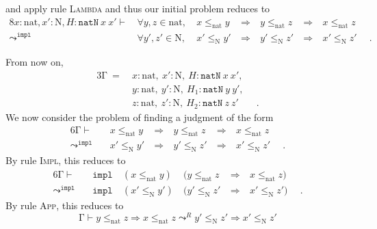 \documentclass{llncs}
\begin{document}
\begin{example}
    and apply rule \textsc{Lambda} and thus our initial problem reduces
    to
    \begin{alignat*}{8}
    x : \mathrm{nat}, x' : \mathrm{N}, H : \mathtt{natN}~x~x' \vdash\,&
        \forall y, z \in \mathrm{nat},~&
        x \leq_{\mathrm{nat}} y~& \Rightarrow~&
        y \leq_{\mathrm{nat}} z~& \Rightarrow~&
        x \leq_{\mathrm{nat}} z & \\
    \leadsto^{\mathtt{impl}}\,&
        \forall y', z' \in \mathrm{N},~&
        x' \leq_{\mathrm{N}} y'~& \Rightarrow~&
        y' \leq_{\mathrm{N}} z'~& \Rightarrow~& x'
        \leq_{\mathrm{N}} z' &
        \enspace .
    \end{alignat*}

    From now on,
    \begin{alignat*}{3}
    \mathrm{\Gamma} ~=~ &
    x : \mathrm{nat},~ x' : \mathrm{N},~ H : \mathtt{natN}~x~x', & \\ &
    y : \mathrm{nat},~ y' : \mathrm{N},~ H_1 : \mathtt{natN}~y~y', & \\ &
    z : \mathrm{nat},~ z' : \mathrm{N},~ H_2 : \mathtt{natN}~z~z' & \enspace .
    \end{alignat*}
    We now consider the problem of finding a judgment of the form
    \begin{alignat*}{6}
    \mathrm{\Gamma} \vdash \quad &
        x \leq_{\mathrm{nat}} y~& \Rightarrow~&
        y \leq_{\mathrm{nat}} z~& \Rightarrow~& x \leq_{\mathrm{nat}} z & \\
    \leadsto^{\mathtt{impl}} \quad &
        x' \leq_{\mathrm{N}} y'~& \Rightarrow~&
        y' \leq_{\mathrm{N}} z'~& \Rightarrow~& x' \leq_{\mathrm{N}} z' &
        \enspace .
    \end{alignat*}
    By rule \textsc{Impl}, this reduces to
    \begin{alignat*}{6}
    \mathrm{\Gamma} \vdash \quad &
        \mathtt{impl} ~&
        (x \leq_{\mathrm{nat}} y)~&
        (y \leq_{\mathrm{nat}} z~& \Rightarrow~& x \leq_{\mathrm{nat}} z) &
        \\
    \leadsto^{\mathtt{impl}} \quad &
        \mathtt{impl} ~&
        (x' \leq_{\mathrm{N}} y')~&
        (y' \leq_{\mathrm{N}} z'~& \Rightarrow~& x' \leq_{\mathrm{N}} z') &
        \enspace .
    \end{alignat*}
    By rule \textsc{App}, this reduces to
    \begin{equation}
    \mathrm{\Gamma} \vdash
    y \leq_{\mathrm{nat}} z \Rightarrow x \leq_{\mathrm{nat}} z
    \leadsto^{R}
    y' \leq_{\mathrm{N}} z' \Rightarrow x' \leq_{\mathrm{N}} z'

\end{equation}
\end{example}
\end{document}
